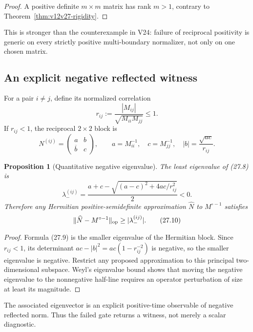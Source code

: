 \documentclass[11pt]{article}
\newtheorem{proposition}[theorem]{Proposition}
\theoremstyle{remark}
\begin{document}
\begin{proof}
A positive definite \(m\times m\) matrix has rank \(m>1\), contrary
to Theorem~\ref{thm:v12v27-rigidity}.
\end{proof}

This is stronger than the counterexample in V24: failure of
reciprocal positivity is generic on every strictly positive
multi-boundary normalizer, not only on one chosen matrix.

\subsection{An explicit negative reflected witness}

For a pair \(i\ne j\), define its normalized correlation
\[
                         r_{ij}:=
 \frac{|M_{ij}|}{\sqrt{M_{ii}M_{jj}}}\le1.                 \tag{27.7}
\]
If \(r_{ij}<1\), the reciprocal \(2\times2\) block is
\[
 N^{(ij)}
 =
 \begin{pmatrix}
 a&b\\ \overline b&c
 \end{pmatrix},
 \qquad
 a=M_{ii}^{-1},\quad c=M_{jj}^{-1},\quad
 |b|=\frac{\sqrt{ac}}{r_{ij}}.                             \tag{27.8}
\]

\begin{proposition}[Quantitative negative eigenvalue]
\label{prop:v12v27-negative}
The least eigenvalue of (27.8) is
\[
 \boxed{
 \lambda_-^{(ij)}
 =
 \frac{a+c-
 \sqrt{(a-c)^2+4ac/r_{ij}^2}}{2}<0.}                       \tag{27.9}
\]
Therefore any Hermitian positive-semidefinite approximation
\(\widehat N\) to \(M^{\circ-1}\) satisfies
\[
                         \|\widehat N-M^{\circ-1}\|_{\rm op}
 \ge|\lambda_-^{(ij)}|.                                    \tag{27.10}
\]
\end{proposition}

\begin{proof}
Formula (27.9) is the smaller eigenvalue of the Hermitian block.
Since \(r_{ij}<1\), its determinant
\(ac-|b|^2=ac(1-r_{ij}^{-2})\) is negative, so the smaller eigenvalue
is negative.  Restrict any proposed approximation to this principal
two-dimensional subspace.  Weyl's eigenvalue bound shows that moving
the negative eigenvalue to the nonnegative half-line requires an
operator perturbation of size at least its magnitude.
\end{proof}

The associated eigenvector is an explicit positive-time observable
of negative reflected norm.  Thus the failed gate returns a witness,
not merely a scalar diagnostic.
\end{document}
